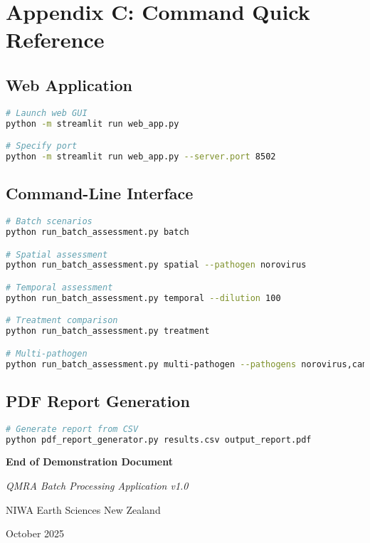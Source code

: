 \documentclass[11pt,a4paper]{article}
\begin{document}
\section{Appendix C: Command Quick Reference}

\subsection{Web Application}
\begin{lstlisting}[style=bashstyle, language=bash]
# Launch web GUI
python -m streamlit run web_app.py

# Specify port
python -m streamlit run web_app.py --server.port 8502
\end{lstlisting}

\subsection{Command-Line Interface}
\begin{lstlisting}[style=bashstyle, language=bash]
# Batch scenarios
python run_batch_assessment.py batch

# Spatial assessment
python run_batch_assessment.py spatial --pathogen norovirus

# Temporal assessment
python run_batch_assessment.py temporal --dilution 100

# Treatment comparison
python run_batch_assessment.py treatment

# Multi-pathogen
python run_batch_assessment.py multi-pathogen --pathogens norovirus,campylobacter
\end{lstlisting}

\subsection{PDF Report Generation}
\begin{lstlisting}[style=bashstyle, language=bash]
# Generate report from CSV
python pdf_report_generator.py results.csv output_report.pdf
\end{lstlisting}

\vfill

\begin{center}
\textbf{\large End of Demonstration Document}

\vspace{1cm}

\textit{QMRA Batch Processing Application v1.0}

NIWA Earth Sciences New Zealand

October 2025
\end{center}
\end{document}
